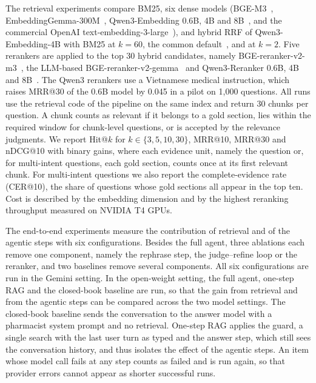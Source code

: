 The retrieval experiments compare BM25, six dense models (BGE-M3~\cite{chen2024bgem3}, EmbeddingGemma-300M~\cite{vera2025embeddinggemma}, Qwen3-Embedding 0.6B, 4B and 8B~\cite{zhang2025qwen3emb}, and the commercial OpenAI text-embedding-3-large~\cite{openai2024embeddings}), and hybrid RRF of Qwen3-Embedding-4B with BM25 at $k=60$, the common default~\cite{cormack2009rrf}, and at $k=2$. Five rerankers are applied to the top 30 hybrid candidates, namely BGE-reranker-v2-m3~\cite{chen2024bgem3}, the LLM-based BGE-reranker-v2-gemma~\cite{li2024llama2vec} and Qwen3-Reranker 0.6B, 4B and 8B~\cite{zhang2025qwen3emb}. The Qwen3 rerankers use a Vietnamese medical instruction, which raises MRR@30 of the 0.6B model by 0.045 in a pilot on 1{,}000 questions. All runs use the retrieval code of the pipeline on the same index and return 30 chunks per question. A chunk counts as relevant if it belongs to a gold section, lies within the required window for chunk-level questions, or is accepted by the relevance judgments. We report Hit@$k$ for $k\in\{3,5,10,30\}$, MRR@10, MRR@30 and nDCG@10 with binary gains, where each evidence unit, namely the question or, for multi-intent questions, each gold section, counts once at its first relevant chunk. For multi-intent questions we also report the complete-evidence rate (CER@10), the share of questions whose gold sections all appear in the top ten. Cost is described by the embedding dimension and by the highest reranking throughput measured on NVIDIA T4 GPUs.

The end-to-end experiments measure the contribution of retrieval and of the agentic steps with six configurations. Besides the full agent, three ablations each remove one component, namely the rephrase step, the judge--refine loop or the reranker, and two baselines remove several components. All six configurations are run in the Gemini setting. In the open-weight setting, the full agent, one-step RAG and the closed-book baseline are run, so that the gain from retrieval and from the agentic steps can be compared across the two model settings. The closed-book baseline sends the conversation to the answer model with a pharmacist system prompt and no retrieval. One-step RAG applies the guard, a single search with the last user turn as typed and the answer step, which still sees the conversation history, and thus isolates the effect of the agentic steps. An item whose model call fails at any step counts as failed and is run again, so that provider errors cannot appear as shorter successful runs.

